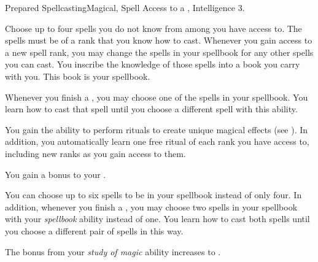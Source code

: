     \begin{magicalfeat}{Prepared Spellcasting}{Magical, Spell}
        \featpre Access to a , Intelligence 3.

         Choose up to four spells you do not know from among  you have access to.
        The spells must be of a rank that you know how to cast.
        Whenever you gain access to a new spell rank, you may change the spells in your spellbook for any other spells you can cast.
        You inscribe the knowledge of those spells into a book you carry with you.
        This book is your spellbook.
        
        Whenever you finish a , you may choose one of the spells in your spellbook.
        You learn how to cast that spell until you choose a different spell with this ability.

         You gain the ability to perform rituals to create unique magical effects (see ).
        In addition, you automatically learn one free ritual of each rank you have access to, including new ranks as you gain access to them.

         You gain a  bonus to your .

         You can choose up to six spells to be in your spellbook instead of only four.
        In addition, whenever you finish a , you may choose two spells in your spellbook with your \textit{spellbook} ability instead of one.
        You learn how to cast both spells until you choose a different pair of spells in this way.

         The bonus from your \textit{study of magic} ability increases to .
    \end{magicalfeat}

